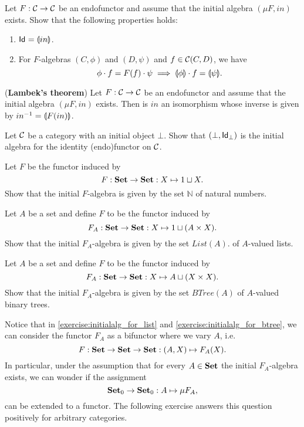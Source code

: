 \begin{exer} Let $F:\CC\to\CC$ be an endofunctor and assume that the initial algebra $(\mu F, in)$ exists. Show that the following properties holds:
\begin{enumerate}
\item $\Id = \catam{in}$.
\item For $F$-algebras $(C,\phi)$ and $(D,\psi)$ and $f\in\CHom{\CC}{C}{D}$, we have 
\[
\phi\Comp f = F(f)\Comp \psi \implies \catam{\phi}\Comp f = \catam{\psi}.
\]
\end{enumerate} 
\end{exer}

\begin{exer} (\textbf{Lambek's theorem}) Let $F:\CC\to\CC$ be an endofunctor and assume that the initial algebra $(\mu F, in)$ exists. Then is $in$ an isomorphism whose inverse is given by $\Inv{in} = \catam{F(in)}$.
\end{exer}

\begin{exer}\label{exercise:initialalg_for_idfun_with_initialob} Let $\CC$ be a category with an initial object $\bot$. Show that $(\bot, \Id[\bot])$ is the initial algebra for the identity (endo)functor on $\CC$.
\end{exer}

\begin{exer} Let $F$ be the functor induced by 
\[
F:\SET\to\SET : X\mapsto 1 \sqcup X.
\]
Show that the initial $F$-algebra is given by the set $\mathbb{N}$ of natural numbers.
\end{exer}

\begin{exer}\label{exercise:initialalg_for_list} Let $A$ be a set and define $F$ to be the functor induced by 
\[
F_A:\SET\to\SET : X\mapsto 1 \sqcup (A\times X).
\]
Show that the initial $F_A$-algebra is given by the set $List(A)$. of $A$-valued lists.
\end{exer}

\begin{exer}\label{exercise:initialalg_for_btree} Let $A$ be a set and define $F$ to be the functor induced by 
\[
F_A:\SET\to\SET : X\mapsto A \sqcup (X\times X).
\]
Show that the initial $F_A$-algebra is given by the set $BTree(A)$ of $A$-valued binary trees.
\end{exer}

\begin{rem} Notice that in \cref{exercise:initialalg_for_list} and \cref{exercise:initialalg_for_btree}, we can consider the functor $F_A$ as a bifunctor where we vary $A$, i.e.
\[
F: \SET\to \SET\to \SET: (A,X)\mapsto F_A(X).
\]
In particular, under the assumption that for every $A\in\SET$ the initial $F_A$-algebra exists, we can wonder if the assignment 
\[
\Ob{\SET} \to \Ob{\SET} : A\mapsto \mu F_A ,
\]
can be extended to a functor. The following exercise answers this question positively for arbitrary categories.
\end{rem}

